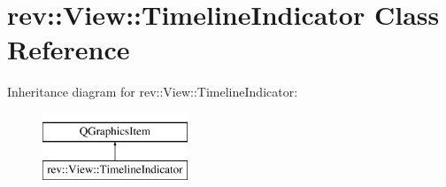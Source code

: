 \hypertarget{classrev_1_1_view_1_1_timeline_indicator}{}\section{rev\+::View\+::Timeline\+Indicator Class Reference}
\label{classrev_1_1_view_1_1_timeline_indicator}
Inheritance diagram for rev\+::View\+::Timeline\+Indicator\+:\begin{figure}[H]
\begin{center}
\leavevmode
\includegraphics[height=2.000000cm]{classrev_1_1_view_1_1_timeline_indicator}
\end{center}
\end{figure}
